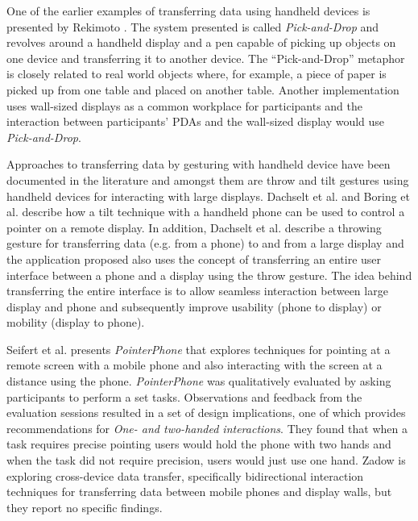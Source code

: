 One of the earlier examples of transferring data using handheld devices is presented by Rekimoto \cite{Rekimoto:1997}. 
The system presented is called \textit{Pick-and-Drop} and revolves around a handheld display and a pen capable of picking up objects on one device and transferring it to another device.
The ``Pick-and-Drop'' metaphor is closely related to real world objects where, for example, a piece of paper is picked up from one table and placed on another table.
Another implementation uses wall-sized displays as a common workplace for participants and the interaction between participants' PDAs and the wall-sized display would use \textit{Pick-and-Drop}.

Approaches to transferring data by gesturing with handheld device have been documented in the literature and amongst them are throw and tilt gestures using handheld devices for interacting with large displays.
Dachselt et al. \cite{Dachselt:2008} and Boring et al. \cite{Boring:2009} describe how a tilt technique with a handheld phone can be used to control a pointer on a remote display.
In addition, Dachselt et al. describe a throwing gesture for transferring data (e.g. from a phone) to and from a large display and the application proposed also uses the concept of transferring an entire user interface between a phone and a display using the throw gesture.
The idea behind transferring the entire interface is to allow seamless interaction between large display and phone and subsequently improve usability (phone to display) or mobility (display to phone).

Seifert et al. \cite{Seifert:2013} presents \textit{PointerPhone} that explores techniques for pointing at a remote screen with a mobile phone and also interacting with the screen at a distance using the phone.
\textit{PointerPhone} was qualitatively evaluated by asking participants to perform a set tasks.
Observations and feedback from the evaluation sessions resulted in a set of design implications, one of which provides recommendations for \textit{One- and two-handed interactions}.
They found that when a task requires precise pointing users would hold the phone with two hands and when the task did not require precision, users would just use one hand.
Zadow \cite{vonZadow:2015} is exploring cross-device data transfer, specifically bidirectional interaction techniques for transferring data between mobile phones and display walls, but they report no specific findings.